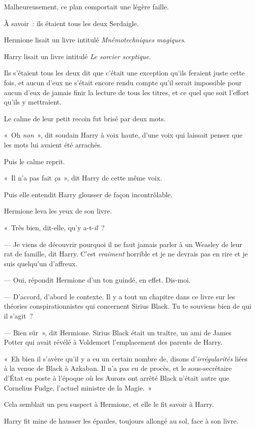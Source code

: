 Malheureusement, ce plan comportait une légère faille.

À savoir~: ils étaient tous les deux Serdaigle.

Hermione lisait un livre intitulé \emph{Mnémotechniques magiques}.

Harry lisait un livre intitulé \emph{Le sorcier sceptique}.

Ils s'étaient tous les deux dit que c'était une exception qu'ils feraient juste cette fois, et aucun d'eux ne s'était encore rendu compte qu'il serait impossible pour aucun d'eux de jamais finir la lecture de tous les titres, et ce quel que soit l'effort qu'ils y mettraient.

Le calme de leur petit recoin fut brisé par deux mots.

«~Oh \emph{non}~», dit soudain Harry à voix haute, d'une voix qui laissait penser que les mots lui avaient été arrachés.

Puis le calme reprit.

«~Il n'a pas fait \emph{ça}~», dit Harry de cette même voix.

Puis elle entendit Harry glousser de façon incontrôlable.

Hermione leva les yeux de son livre.

«~Très bien, dit-elle, qu'y a-t-\emph{il}~?

--- Je viens de découvrir pourquoi il ne faut jamais parler à un Weasley de leur rat de famille, dit Harry. C'est \emph{vraiment} horrible et je ne devrais pas en rire et je suis quelqu'un d'affreux.

--- Oui, répondit Hermione d'un ton guindé, en effet. Dis-moi.

--- D'accord, d'abord le contexte. Il y a tout un chapitre dans ce livre sur les théories conspirationnistes qui concernent Sirius Black. Tu te souviens bien de qui il s'agit~?

--- Bien sûr~», dit Hermione. Sirius Black était un traître, un ami de James Potter qui avait révélé à Voldemort l'emplacement des parents de Harry.

«~Eh bien il s'avère qu'il y a eu un certain nombre de, disons d'\emph{irrégularités} liées à la venue de Black à Azkaban. Il n'a pas eu de procès, et le sous-secrétaire d'État en poste à l'époque où les Aurors ont arrêté Black n'était autre que Cornelius Fudge, l'actuel ministre de la Magie.~»

Cela semblait un peu suspect à Hermione, et elle le fit savoir à Harry.

Harry fit mine de hausser les épaules, toujours allongé au sol, face à son livre.

